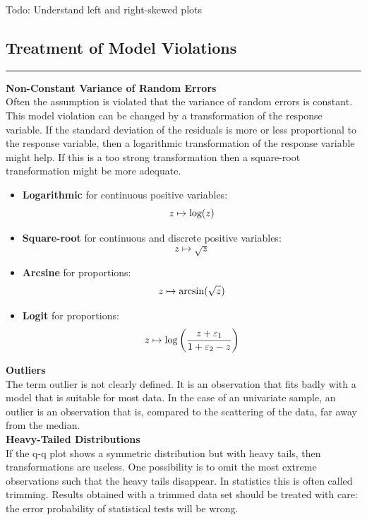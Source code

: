 Todo: Understand left and right-skewed plots

\subsection{Treatment of Model Violations}
\noindent\rule[\linienAbstand]{\linewidth}{\linienDicke}

\textbf{Non-Constant Variance of Random Errors}\\
Often the assumption is violated that the variance of random errors is constant.\\
This model violation can be changed by a transformation of the response variable. If the standard deviation of the residuals is more or less proportional to the response variable, then a logarithmic transformation of the response variable might help. If this is a too strong transformation then a square-root transformation might be more adequate.
\begin{itemize}
  \item \textbf{Logarithmic} for continuous positive variables:
  \begin{equation}
    z \mapsto \textup{log}(z)
  \end{equation}
  \item \textbf{Square-root} for continuous and discrete positive variables:
  \begin{equation}
    z \mapsto \sqrt{z}
  \end{equation}
  \item \textbf{Arcsine} for proportions:
  \begin{equation}
    z \mapsto \textup{arcsin}(\sqrt{z})
  \end{equation}
  \item \textbf{Logit} for proportions:
  \begin{equation}
    z \mapsto \textup{log}\left(\frac{z + \varepsilon_1}{1 + \varepsilon_2 - z} \right)
  \end{equation}
\end{itemize}

\textbf{Outliers}\\
The term outlier is not clearly defined. It is an observation that fits badly with a model that is suitable for most data. In the case of an univariate sample, an outlier is an observation that is, compared to the scattering of the data, far away from the median.\\

\textbf{Heavy-Tailed Distributions}\\
If the q-q plot shows a symmetric distribution but with heavy tails, then transformations are useless. One possibility is to omit the most extreme observations such that the heavy tails disappear. In statistics this is often called trimming. Results obtained with a trimmed data set should be treated with care: the error probability of statistical tests will be wrong.

